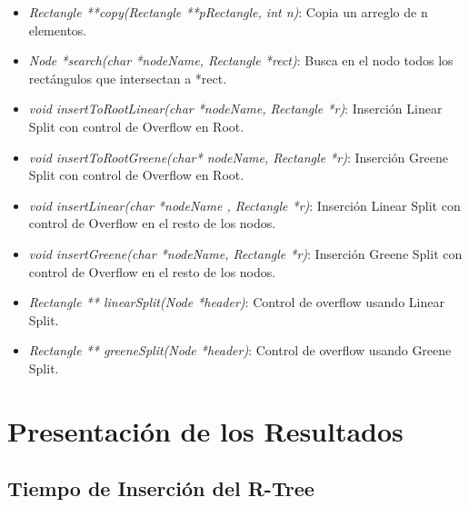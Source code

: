\documentclass[letterpaper,10pt]{article}
\begin{document}
\begin{itemize}
		\item \textit{Rectangle **copy(Rectangle **pRectangle, int n)}: Copia un arreglo de n elementos.
		\item \textit{Node *search(char *nodeName, Rectangle *rect)}: Busca en el nodo todos los rectángulos que intersectan a *rect.
		\item \textit{void insertToRootLinear(char *nodeName, Rectangle *r)}: Inserción Linear Split con control de Overflow en Root.
		\item \textit{void insertToRootGreene(char* nodeName, Rectangle *r)}: Inserción Greene Split con control de Overflow en Root.
		\item \textit{void insertLinear(char *nodeName , Rectangle *r)}: Inserción Linear Split con control de Overflow en el resto de los nodos.
		\item \textit{void insertGreene(char *nodeName, Rectangle *r)}: Inserción Greene Split con control de Overflow en el resto de los nodos.
		\item \textit{Rectangle ** linearSplit(Node *header)}: Control de overflow usando Linear Split.
		\item \textit{Rectangle ** greeneSplit(Node *header)}: Control de overflow usando Greene Split.
	\end{itemize}

	\newpage

	\section{Presentación de los Resultados}

	\subsection{Tiempo de Inserción del R-Tree}
\end{document}
